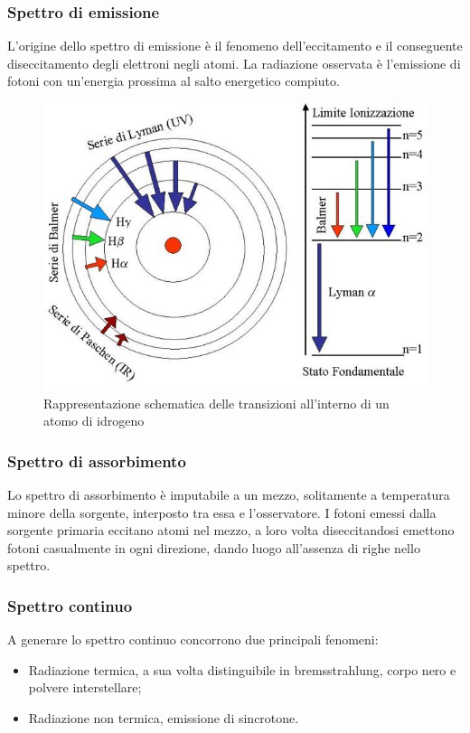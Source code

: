 \subsubsection*{Spettro di emissione}
L'origine dello spettro di emissione è il fenomeno dell'eccitamento e il conseguente diseccitamento degli elettroni negli atomi. La radiazione osservata è l'emissione di fotoni con un'energia prossima al salto energetico compiuto.

\begin{figure}[h]
\includegraphics[scale=0.30]{transizione.pdf}
\centering
\caption{Rappresentazione schematica delle transizioni all'interno di un atomo di idrogeno}
\end{figure}


\subsubsection*{Spettro di assorbimento}
Lo spettro di assorbimento è imputabile a un mezzo, solitamente a temperatura minore della sorgente, interposto tra essa e l'osservatore. I fotoni emessi dalla sorgente primaria eccitano atomi nel mezzo, a loro volta diseccitandosi emettono fotoni casualmente in ogni direzione, dando luogo all'assenza di righe nello spettro.


\subsubsection*{Spettro continuo}
A generare lo spettro continuo concorrono due principali fenomeni: 
\begin{itemize}
\item Radiazione termica, a sua volta distinguibile in bremsstrahlung, corpo nero e polvere interstellare;
\item Radiazione non termica, emissione di sincrotone. 
\end{itemize}

